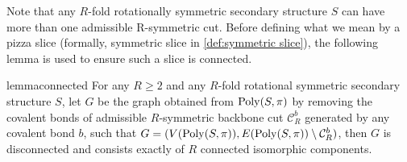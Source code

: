 Note that any $R$-fold rotationally symmetric secondary structure $S$ can have more than one admissible R-symmetric cut. Before defining what we mean by a pizza slice (formally, symmetric slice in \cref{def:symmetric slice}),  the following lemma is used to  ensure such a slice is  connected.

\begin{restatable} {lemma}{connected} 
	\label{lem:connected}
	For any $R\geq 2$ and any $R$-fold rotational symmetric secondary structure $S$, let $G$ be the graph obtained from $\mathrm{Poly}(S,\pi)$ by removing the covalent bonds of admissible $R$-symmetric backbone cut $\mathcal{C}_R^b$ generated by any covalent bond $b$, such that $G=(V(\mathrm{Poly}(S,\pi)), E(\mathrm{Poly}(S,\pi))\setminus\mathcal{C}_R^b)$, then $G$ is disconnected and consists exactly of $R$ connected isomorphic components.
\end{restatable}  




